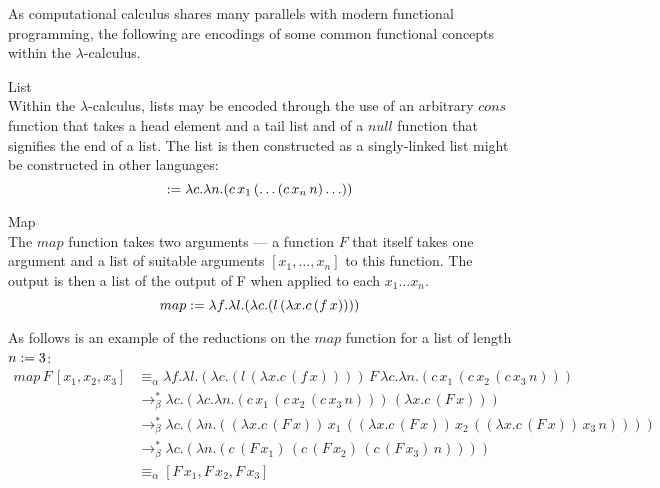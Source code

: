     As computational calculus shares many parallels with modern functional programming, the following are encodings of some common functional concepts within the $\lambda$-calculus.

    \begin{definition}{List\\}
        Within the $\lambda$-calculus, lists may be encoded through the use of an arbitrary ${cons}$ function that takes a head element and a tail list and of a ${null}$ function that signifies the end of a list.
        The list is then constructed as a singly-linked list might be constructed in other languages:
        \begin{equation*}
            [x_1, \ldots, x_n] \defeq \lambda c . \lambda n . (c \, x_1 \, (\ldots (c \, x_n \, n) \ldots) )
        \end{equation*}
    \end{definition}


    \begin{definition}{Map\\}
        The $map$ function takes two arguments --- a function $F$ that itself takes one argument and a list of suitable arguments $[x_1, \ldots, x_n]$ to this function.
        The output is then a list of the output of F when applied to each $x_1 \ldots x_n$.
        \begin{equation*}
            {map} := \lambda f . \lambda l . (\lambda c . (l \, (\lambda x . c \, (f \, x))))
        \end{equation*}
    \end{definition}


    \begin{example*}
        As follows is an example of the reductions on the ${map}$ function for a list of length $n := 3$:
        \begin{align*}
            {map} \, F \, [x_1, x_2, x_3]
                  & \equiv_{\alpha} \lambda f . \lambda l . (\lambda c . (l \, (\lambda x . c \, (f \, x)))) \, F \, \lambda c . \lambda n . (c \, x_1 \, (c \, x_2 \, (c \, x_3 \, n))) \\
                  & \rightarrow_\beta^* \lambda c . (\lambda c . \lambda n . (c \, x_1 \, (c \, x_2 \, (c \, x_3 \, n))) \, (\lambda x . c \, (F \, x))) \\
                  & \rightarrow_\beta^* \lambda c . (\lambda n . ((\lambda x . c \, (F \, x)) \, x_1 \, ((\lambda x . c \, (F \, x)) \, x_2 \, ((\lambda x . c \, (F \, x)) \, x_3 \, n)))) \\
                  & \rightarrow_\beta^* \lambda c . (\lambda n . (c \, (F \, x_1) \, (c \, (F \, x_2) \, (c \, (F \, x_3) \, n)))) \\
                  & \equiv_{\alpha} [F \, x_1, F \, x_2, F \, x_3]
        \end{align*}
    \end{example*}

